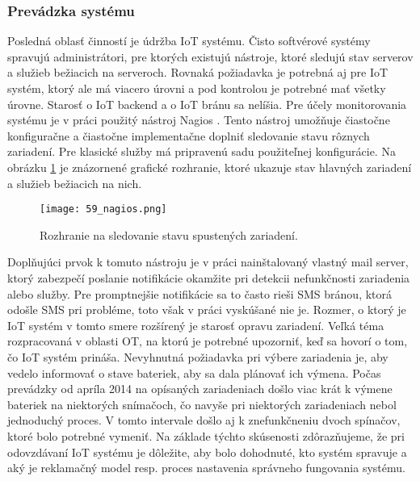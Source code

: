 \subsubsection{Prevádzka systému}
Posledná oblasť činností je údržba IoT systému. Čisto softvérové systémy spravujú administrátori, pre ktorých existujú nástroje, ktoré sledujú stav serverov a služieb bežiacich na serveroch. Rovnaká požiadavka je potrebná aj pre IoT systém, ktorý ale má viacero úrovni a pod kontrolou je potrebné mať všetky úrovne. Starosť o IoT backend a o IoT bránu sa nelíšia. Pre účely monitorovania systému je v práci použitý nástroj Nagios \cite{IOT35}. Tento nástroj umožňuje čiastočne konfiguračne a čiastočne implementačne doplniť sledovanie stavu rôznych zariadení. Pre klasické služby má pripravenú sadu použiteľnej konfigurácie. Na obrázku \ref{59_nagios} je znázornené grafické rozhranie, ktoré ukazuje stav hlavných zariadení a služieb bežiacich na nich.
\begin{figure}[!htbp]
\centering
\texttt{[image: 59\_nagios.png]}
\caption{Rozhranie na sledovanie stavu spustených zariadení.}
\label{59_nagios}
\end{figure}
Doplňujúci prvok k tomuto nástroju je v práci nainštalovaný vlastný mail server, ktorý zabezpečí poslanie notifikácie okamžite pri detekcii nefunkčnosti zariadenia alebo služby. Pre promptnejšie notifikácie sa to často rieši SMS bránou, ktorá odošle SMS pri probléme, toto však v práci vyskúšané nie je. Rozmer, o ktorý je IoT systém v tomto smere rozšírený je starosť opravu zariadení. Veľká téma rozpracovaná v oblasti OT, na ktorú je potrebné upozorniť, keď sa hovorí o tom, čo IoT systém prináša. Nevyhnutná požiadavka pri výbere zariadenia je, aby vedelo informovať o stave bateriek, aby sa dala plánovať ich výmena. Počas prevádzky od apríla 2014 na opísaných zariadeniach došlo viac krát k výmene bateriek na niektorých snímačoch, čo navyše pri niektorých zariadeniach nebol jednoduchý proces. V tomto intervale došlo aj k znefunkčneniu dvoch spínačov, ktoré bolo potrebné vymeniť. Na základe týchto skúsenosti zdôrazňujeme, že pri odovzdávaní IoT systému je dôležite, aby bolo dohodnuté, kto systém spravuje a aký je reklamačný model resp. proces nastavenia správneho fungovania systému.
